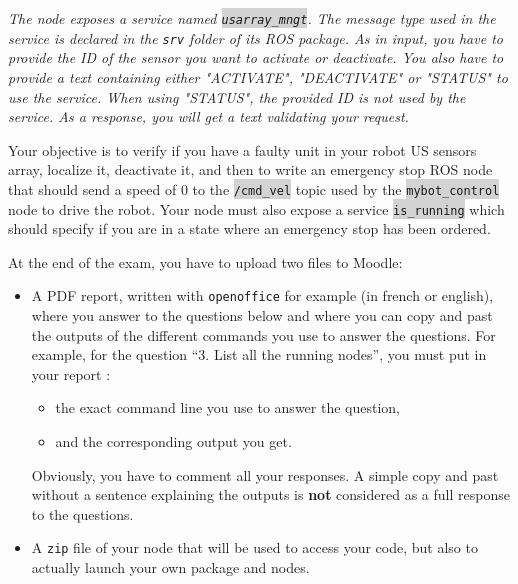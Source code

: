 \documentclass[10pt,a4paper,english]{exam}
\newcommand{\mytext}[1]{\colorbox{lightgray}{\texttt{#1}}}
\begin{document}
\begin{tcolorbox}
	\textit{The node exposes a service named \mytext{usarray\_mngt}. The message type used in the
		service is declared in the \texttt{srv} folder of its ROS package. As in input, you have to
		provide the ID of the sensor you want to activate or deactivate. You also have to provide a
		text containing either "ACTIVATE", "DEACTIVATE" or "STATUS" to use the service. When using
		"STATUS", the provided ID is not used by the service. As a response, you will get a text
		validating your request.}
\end{tcolorbox}

Your objective is to verify if you have a faulty unit in your robot US sensors array, localize it,
deactivate it, and then to write an emergency stop ROS node that should send a speed of 0 to the
\mytext{/cmd\_vel} topic used by the \mytext{mybot\_control} node to drive the robot. Your node must
also expose a service \mytext{is\_running} which should specify if you are in a state where an
emergency stop has been ordered.

\begin{mdframed}[style=evaluation]
	At the end of the exam, you have to upload two files to Moodle:
	\begin{itemize}
		\item A PDF report, written with \texttt{openoffice} for example (in french or english), where
		      you answer to the questions below and where you can copy and past the outputs of the
		      different commands you use to answer the questions. For example, for the question ``3.
		      List all the running nodes'', you must put in your report :
		      \begin{itemize}
			      \item the exact command line you use to answer the question,
			      \item and the corresponding output you get.
		      \end{itemize}
		      Obviously, you have to comment all your responses. A simple copy and past without a
		      sentence explaining the outputs is \textbf{not} considered as a full response to the
		      questions.
		\item A \texttt{zip} file of your node that will be used to access your code, but also to
		      actually launch your own package and nodes.
	\end{itemize}
\end{mdframed}
\end{document}
